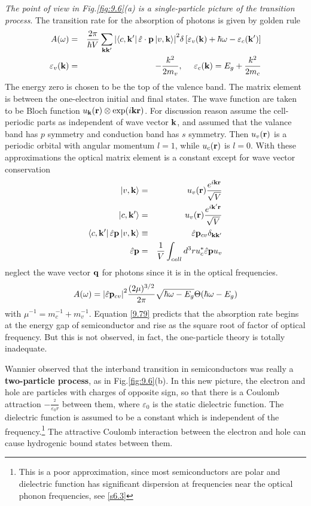 \textit{The point of view in Fig.\ref{fig:9.6}(a) is a single-particle picture of the transition process}.
The transition rate for the absorption of photons is given by golden rule
\begin{eqnarray}
    A(\omega) &=& \frac{2\pi}{\hbar V} \sum_{\mathbf{k} \mathbf{k}'} \abs{ \bra{c,\mathbf{k}'} \hat{\varepsilon} \cdot \mathbf{p} \ket{v,\mathbf{k}} }^2 \delta \left[\varepsilon_v(\mathbf{k}) + \hbar \omega - \varepsilon_c(\mathbf{k}') \right]      \label{9.73} \\
    \varepsilon_v(\mathbf{k}) &=& - \frac{k^2}{2m_v},  ~ ~ ~ ~ \varepsilon_c(\mathbf{k}) = E_g + \frac{k^2}{2m_c}  \label{9.74}
\end{eqnarray}
The energy zero is chosen to be the top of the valence band.
The matrix element is between the one-electron initial and final states.
The wave function are taken to be Bloch function $u_{\mathbf{k}}(\mathbf{r}) \otimes\exp(i\mathbf{k} \mathbf{r})$.
For discussion reason assume the cell-periodic parts as independent of wave vector $\mathbf{k}$, and assumed that the valance band has $p$ symmetry and conduction band has $s$ symmetry.
Then $u_v(\mathbf{r})$ is a periodic orbital with angular momentum $l=1$, while $u_c(\mathbf{r})$ is $l=0$.
With these approximations the optical matrix element is a constant except for wave vector conservation
\begin{eqnarray}
    \ket{v,\mathbf{k}} &=& u_v(\mathbf{r}) \frac{e^{i\mathbf{k}\mathbf{r}}}{\sqrt{V}} \label{9.75} \\
    \ket{c,\mathbf{k}'} &=& u_v(\mathbf{r}) \frac{e^{i\mathbf{k}'\mathbf{r}}}{\sqrt{V}} \label{9.76} \\
    \bra{c,\mathbf{k}'} \hat{\varepsilon} \mathbf{p} \ket{v,\mathbf{k}} &\equiv& \hat{\varepsilon} \mathbf{p}_{cv} \delta_{\mathbf{k}\mathbf{k}'} \label{9.77} \\
    \hat{\varepsilon}\mathbf{p} &=& \frac{1}{V} \int_{cell} d^3 r u_c^* \hat{\varepsilon} \mathbf{p} u_v  \label{9.78}
\end{eqnarray}
neglect the wave vector $\mathbf{q}$ for photons since it is in the optical frequencies.
\begin{equation}
    A(\omega) = \abs{\hat{\varepsilon} \mathbf{p}_{cv} }^2 \frac{(2\mu)^{3/2}}{2\pi} \sqrt{\hbar \omega - E_g} \Theta(\hbar \omega -E_g)   \label{9.79}
\end{equation}
with $\mu^{-1} = m_c^{-1} + m_v^{-1}$.
Equation \eqref{9.79} predicts that the absorption rate begins at the energy gap of semiconductor and rise as the square root of factor of optical frequency.
But this is not observed, in fact, the one-particle theory is totally inadequate.

Wannier observed that the interband transition in semiconductors was really a \textbf{two-particle process}, as in Fig.\ref{fig:9.6}(b).
In this new picture, the electron and hole are particles with charges of opposite sign, so that there is a Coulomb attraction $- \frac{^2}{\varepsilon_0 r}$ between them, where $\varepsilon_0$ is the static dielectric function.
The dielectric function is assumed to be a constant which is independent of the frequency.\footnote{This is a poor approximation, since most semiconductors are polar and dielectric function has significant dispersion at frequencies near the optical phonon frequencies, see \ref{s6.3}}
The attractive Coulomb interaction between the electron and hole can cause hydrogenic bound states between them.

